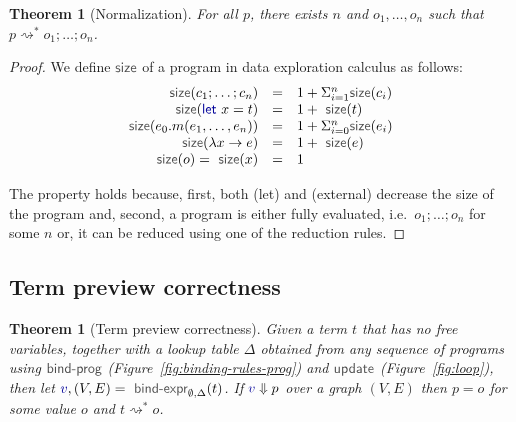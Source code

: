 \documentclass[acmsmall,anonymous,fleqn]{acmart}\settopmatter{printfolios=false,printccs=false,printacmref=false}
\newcounter{thc}
\theoremstyle{plain}
\newtheorem{theorem}[thc]{Theorem}
\theoremstyle{definition}
\newcommand{\ident}[1]{\textnormal{\textcolor{idclr}{\sffamily #1}}}
\newcommand{\kvd}[1]{\textnormal{\textcolor{kvdclr}{\sffamily #1}}}
\newcommand{\bndclr}[1]{\textcolor{kvdclr}{#1}}
\newcommand{\rname}[1]{{\sffamily\small(#1)}}
\begin{document}
\begin{theorem}[Normalization]
For all $p$, there exists $n$ and $o_1, \ldots, o_n$ such that $p\rightsquigarrow^{*} o_1;\ldots;o_n$.
\end{theorem}
\begin{proof}
We define $\ident{size}$ of a program in data exploration calculus as follows:
\begin{equation}
\begin{array}{rcl}
\ident{size}(c_1; \ldots; c_n) &=& 1 + \Sigma^{n}_{i=1} \ident{size}(c_i)\\
\ident{size}(\kvd{let}~x=t) &=& 1 + \ident{size}(t)\\
\ident{size}(e_0.m(e_1, \ldots, e_n)) &=& 1 + \Sigma^{n}_{i=0} \ident{size}(e_i)\\
\ident{size}(\lambda x\rightarrow e) &=& 1 + \ident{size}(e)\\
\ident{size}(o) = \ident{size}(x) &=& 1\\
\end{array}
\end{equation}

\noindent
The property holds because, first, both \rname{let} and \rname{external} decrease the \ident{size}
of the program and, second, a program is either fully evaluated, i.e.~$o_1;\ldots;o_n$ for some $n$
or, it can be reduced using one of the reduction rules.
\end{proof}


\subsection{Term preview correctness}
\label{sec:app-correctness}

\begin{theorem}[Term preview correctness]
Given a term $t$ that has no free variables, together with a lookup table $\Delta$ obtained
from any sequence of programs using $\ident{bind-prog}$ (Figure~\ref{fig:binding-rules-prog}) and
$\ident{update}$ (Figure~\ref{fig:loop}), then
let $\bndclr{v}, (V, E) = \ident{bind-expr}_{\emptyset, \Delta}(t)$. If $\bndclr{v}\Downarrow p$
over a graph $(V, E)$ then $p = o$ for some value $o$ and $t \rightsquigarrow^{*} o$.
\end{theorem}
\end{document}
